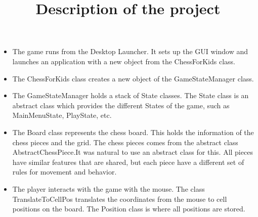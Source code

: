 \documentclass{article}
\title{Description of the project}
\date{}
\begin{document}
	\maketitle
\begin{itemize}
\item The game runs from the Desktop Launcher. It sets up the GUI window and launches an application with a new object from the ChessForKids class.
\item The ChessForKids class creates a new object of the GameStateManager class. 
\item The GameStateManager holds a stack of State classes. The State class is an abstract class which provides the different States of the game, such as MainMenuState, PlayState, etc.
\item The Board class represents the chess board. This holds the information of the chess pieces and the grid. The chess pieces comes from the abstract class AbstractChessPiece.It was natural to use an abstract class for this. All pieces have similar features that are shared, but each piece have a different set of rules for movement and behavior.
\item The player interacts with the game with the mouse. The class TranslateToCellPos translates the coordinates from the mouse to cell positions on the board. The Position class is where all positions are stored.
\end{itemize}
\end{document}

